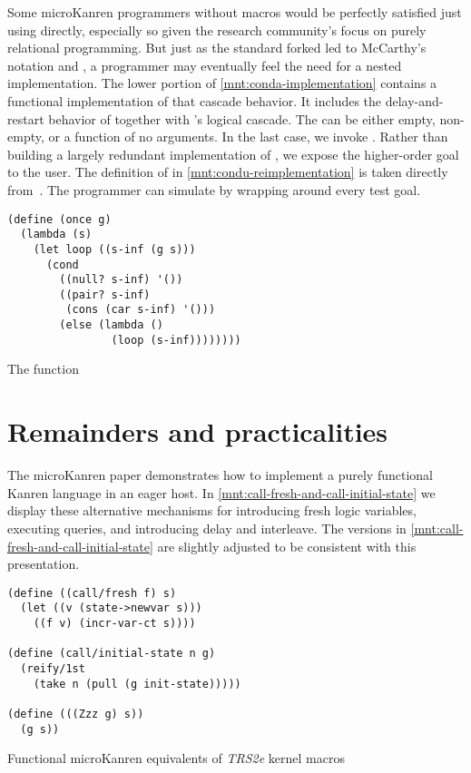 \documentclass[sigplan,balance,pbalance,natbib=false]{acmart}
\begin{document}
Some microKanren programmers without macros would be perfectly
satisfied just using  directly, especially so given
the research community's focus on purely relational programming. But
just as the standard forked  led to
McCarthy's  notation and , a
programmer may eventually feel the need for a nested implementation.
The lower portion of \cref{mnt:conda-implementation} contains a
functional implementation of that cascade behavior. It includes the
delay-and-restart behavior of  together
with 's logical cascade. The  can be
either empty, non-empty, or a function of no arguments. In the last
case, we invoke . Rather than building a largely
redundant implementation of , we expose the
higher-order goal  to the user. The definition
of  in \cref{mnt:condu-reimplementation} is taken
directly from~\cite{friedman2018reasoned}. The programmer can
simulate  by wrapping  around every
test goal.

\begin{listing}
  \begin{verbatim}
(define (once g)
  (lambda (s)
    (let loop ((s-inf (g s)))
      (cond
        ((null? s-inf) '())
        ((pair? s-inf)
         (cons (car s-inf) '()))
        (else (lambda ()
                (loop (s-inf))))))))
  \end{verbatim}
  \caption{The  function}\label{mnt:condu-reimplementation}
\end{listing}

\section{Remainders and practicalities}\label{sec:functional}

The \citeyear{hemann2013muKanren} microKanren paper demonstrates how
to implement a purely functional Kanren language in an eager host. In
\cref{mnt:call-fresh-and-call-initial-state} we display these
alternative mechanisms for introducing fresh logic variables,
executing queries, and introducing delay and interleave. The versions
in \cref{mnt:call-fresh-and-call-initial-state} are slightly adjusted
to be consistent with this presentation.

\begin{listing}
  \begin{verbatim}
(define ((call/fresh f) s)
  (let ((v (state->newvar s)))
    ((f v) (incr-var-ct s))))

(define (call/initial-state n g)
  (reify/1st
    (take n (pull (g init-state)))))

(define (((Zzz g) s))
  (g s))
  \end{verbatim}
  \caption{Functional microKanren equivalents of \emph{TRS2e} kernel macros}\label{mnt:call-fresh-and-call-initial-state}
\end{listing}
\end{document}
